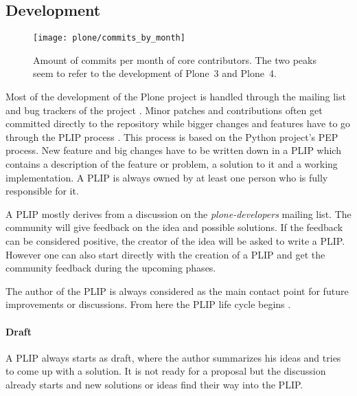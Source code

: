 
\subsection{Development} %

\begin{figure}[thbp]
  \centering
  \texttt{[image: plone/commits\_by\_month]}
  \caption[Commits by Month, Plone]
  {Amount of commits per month of core contributors. The two peaks seem to
    refer to the development of Plone~3 and Plone~4.}
  \label{fig:plone:cbm}
\end{figure}

Most of the development of the Plone project is handled through the mailing
list and bug trackers of the project
\cite{PloneContribute,PloneCommunityProcesses}. Minor patches and contributions
often get committed directly to the repository while bigger changes and
features have to go through the \ac{PLIP} process
\cite{PlonePLIPProcess,PloneCommunityProcesses,PlonePLIPLifecycle}. This
process is based on the Python project's \acf*{PEP} process. New feature and
big changes have to be written down in a \ac{PLIP} which contains a description
of the feature or problem, a solution to it and a working implementation. A
\ac{PLIP} is always owned by at least one person who is fully responsible for
it.

A \ac{PLIP} mostly derives from a discussion on the \emph{plone-developers}
mailing list. The community will give feedback on the idea and possible
solutions. If the feedback can be considered positive, the creator of the idea
will be asked to write a \ac{PLIP}. However one can also start directly with
the creation of a \ac{PLIP} and get the community feedback during the upcoming
phases.

The author of the \ac{PLIP} is always considered as the main contact point for
future improvements or discussions. From here the \ac{PLIP} life cycle begins
\cite{PlonePLIPLifecycle}.

\paragraph{Draft}

A \ac{PLIP} always starts as draft, where the author summarizes his ideas and
tries to come up with a solution. It is not ready for a proposal but the
discussion already starts and new solutions or ideas find their way into the
\ac{PLIP}.

